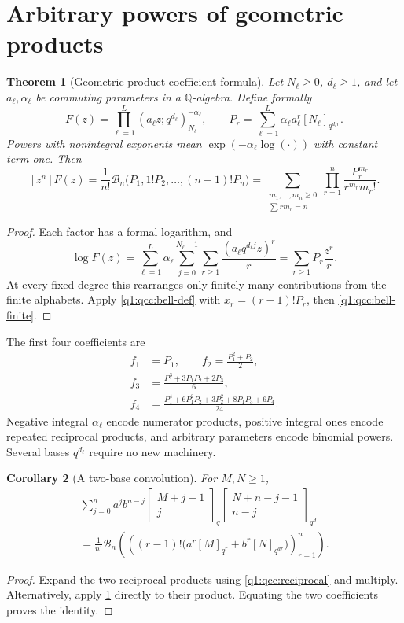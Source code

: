 \documentclass[11pt,a4paper,oneside,openany]{book}
\newtheorem{theorem}{Theorem}[chapter]
\newtheorem{corollary}[theorem]{Corollary}
\theoremstyle{definition}
\theoremstyle{remark}
\newcommand{\Q}{\mathbb Q}
\newcommand{\GB}[3][q]{\begin{bmatrix}#2\\#3\end{bmatrix}_{#1}}
\newcommand{\qi}[2][q]{[#2]_{#1}}
\newcommand{\Y}[1]{\mathcal B_{#1}}
\begin{document}
\section{Arbitrary powers of geometric products}
\begin{theorem}[Geometric-product coefficient formula]\label{q1:qcc:master-theorem}
Let \(N_\ell\ge0\), \(d_\ell\ge1\), and let \(a_\ell,\alpha_\ell\) be
commuting parameters in a \(\Q\)-algebra. Define formally
\begin{equation}\label{q1:qcc:master-product}
 F(z)=\prod_{\ell=1}^L(a_\ell z;q^{d_\ell})_{N_\ell}^{-\alpha_\ell},
 \qquad
 P_r=\sum_{\ell=1}^L\alpha_\ell a_\ell^r\qi[q^{d_\ell r}]{N_\ell}.
\end{equation}
Powers with nonintegral exponents mean \(\exp(-\alpha_\ell\log(\cdot))\)
with constant term one. Then
\begin{equation}\label{q1:qcc:master-coefficient}
 [z^n]F(z)=\frac1{n!}\Y n\bigl(P_1,1!P_2,\ldots,(n-1)!P_n\bigr)
 =\sum_{\substack{m_1,\ldots,m_n\ge0\\\sum r m_r=n}}
 \prod_{r=1}^n\frac{P_r^{m_r}}{r^{m_r}m_r!}.
\end{equation}
\end{theorem}
\begin{proof}
Each factor has a formal logarithm, and
\[
 \log F(z)
 =\sum_{\ell=1}^L\alpha_\ell\sum_{j=0}^{N_\ell-1}
       \sum_{r\ge1}\frac{(a_\ell q^{d_\ell j}z)^r}{r}
 =\sum_{r\ge1}P_r\frac{z^r}{r}.
\]
At every fixed degree this rearranges only finitely many contributions from the
finite alphabets. Apply \eqref{q1:qcc:bell-def} with
\(x_r=(r-1)!P_r\), then \eqref{q1:qcc:bell-finite}.
\end{proof}
The first four coefficients are
\begin{align*}
 f_1&=P_1,\qquad f_2=\frac{P_1^2+P_2}{2},\\
 f_3&=\frac{P_1^3+3P_1P_2+2P_3}{6},\\
 f_4&=\frac{P_1^4+6P_1^2P_2+3P_2^2+8P_1P_3+6P_4}{24}.
\end{align*}
Negative integral \(\alpha_\ell\) encode numerator products, positive integral
ones encode repeated reciprocal products, and arbitrary parameters encode
binomial powers. Several bases \(q^{d_\ell}\) require no new machinery.

\begin{corollary}[A two-base convolution]\label{q1:qcc:two-base}
For \(M,N\ge1\),
\begin{multline}\label{q1:qcc:two-base-formula}
 \sum_{j=0}^n a^j b^{n-j}
 \GB[q]{M+j-1}j\GB[q^d]{N+n-j-1}{n-j}\\
 =\frac1{n!}\Y n\left(
 \left((r-1)!\bigl(a^r\qi[q^r]M+b^r\qi[q^{dr}]N\bigr)\right)_{r=1}^n
 \right).
\end{multline}
\end{corollary}
\begin{proof}
Expand the two reciprocal products using \eqref{q1:qcc:reciprocal} and multiply.
Alternatively, apply \cref{q1:qcc:master-theorem} directly to their product. Equating
the two coefficients proves the identity.
\end{proof}
\end{document}

